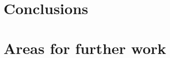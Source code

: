 \documentclass[12pt, twocolumn]{article}
\begin{document}
\section{Conclusions}

\section{Areas for further work}



 
\end{document}
